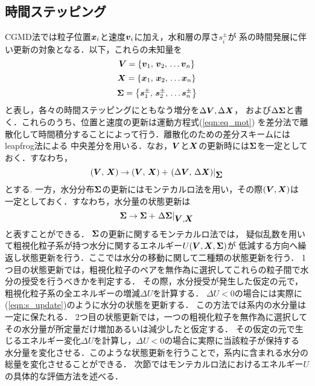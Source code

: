 \subsection{時間ステッピング}
CGMD法では粒子位置$\mbox{\boldmath $x$}_i$と速度$\mbox{\boldmath $v$}_i$に加え，水和層の厚さ$s_i^\pm$が
系の時間発展に伴い更新の対象となる．以下，これらの未知量を
\begin{equation}
	\mbox{\boldmath $V$}=\left\{ \mbox{\boldmath $v$}_1,\, \mbox{\boldmath $v$}_2,\, \dots \mbox{\boldmath $v$}_n \right\}
	\label{eqn:defV}
\end{equation}
\begin{equation}
	\mbox{\boldmath $X$}=\left\{ \mbox{\boldmath $x$}_1,\, \mbox{\boldmath $x$}_2,\, \dots \mbox{\boldmath $x$}_n \right\}
	\label{eqn:defV}
\end{equation}
\begin{equation}
	\mbox{\boldmath $\Sigma$}=\left\{ \mbox{\boldmath $s$}_1^\pm,\, \mbox{\boldmath $s$}_2^\pm,\, \dots \mbox{\boldmath $s$}_n^\pm \right\}
	\label{eqn:defV}
\end{equation}
と表し，各々の時間ステッピングにともなう増分を$\Delta \mbox{\boldmath $V$},\Delta \mbox{\boldmath $X$}$，
および$\Delta \mbox{\boldmath $\Sigma$}$と書く．これらのうち、位置と速度の更新は運動方程式(\ref{eqn:eq_mot})
を差分法で離散化して時間積分することによって行う．離散化のための差分スキームにはleapfrog法による
中央差分を用いる．なお，$\mbox{\boldmath $V$}$と$\mbox{\boldmath $X$}$の更新時には$\mbox{\boldmath $\Sigma$}$を一定としておく．すなわち，
\begin{equation}
	\left( \mbox{\boldmath $V$},\,\mbox{\boldmath $X$} \right)
	\rightarrow 
	\left( \mbox{\boldmath $V$},\,\mbox{\boldmath $X$} \right)
	+
	\left. \left( \Delta \mbox{\boldmath $V$},\, \Delta \mbox{\boldmath $X$} \right) \right|_{\mbox{\boldmath $\Sigma$}}
	\label{eqn:vx_update}
\end{equation}
とする. 一方，水分分布$\mbox{\boldmath $\Sigma$}$の更新にはモンテカルロ法を用い，その際$(\mbox{\boldmath $V$},\mbox{\boldmath $X$})$は
一定としておく．すなわち，水分量の状態更新は
\begin{equation}
	\mbox{\boldmath $\Sigma$} \rightarrow \mbox{\boldmath $\Sigma$} + \left. \Delta \mbox{\boldmath $\Sigma$} \right|_{\mbox{\boldmath $V$},\mbox{\boldmath $X$}}
	\label{eqn:s_update}
\end{equation}
と表すことができる．
$\mbox{\boldmath $\Sigma$}$の更新に関するモンテカルロ法では，
疑似乱数を用いて粗視化粒子系が持つ水分に関するエネルギー$U(\mbox{\boldmath $V$},\mbox{\boldmath $X$},\mbox{\boldmath $\Sigma$})$が
低減する方向へ繰返し状態更新を行う．ここでは水分の移動に関して二種類の状態更新を行う．
1つ目の状態更新では，粗視化粒子のペアを無作為に選択してこれらの粒子間で水分の授受を行うべきかを判定する．
その際，水分授受が発生した仮定の元で，粗視化粒子系の全エネルギーの増減$\Delta U$を計算する．
$\Delta U<0$の場合には実際に(\ref{eqn:s_update})のように水分の状態を更新する．
この方法では系内の水分量は一定に保たれる．
2つ目の状態更新では，一つの粗視化粒子を無作為に選択してその水分量が所定量だけ増加あるいは減少したと仮定する．
その仮定の元で生じるエネルギー変化$\Delta U$を計算し，$\Delta U<0$の場合に実際に当該粒子が保持する
水分量を変化させる．このような状態更新を行うことで，系内に含まれる水分の総量を変化させることができる．
次節ではモンテカルロ法におけるエネルギー$U$の具体的な評価方法を述べる．
